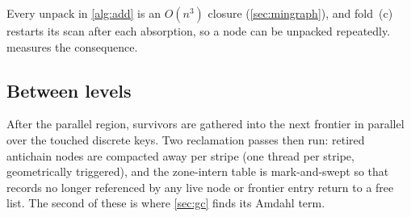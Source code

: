 Every $\mathrm{unpack}$ in \cref{alg:add} is an $O(n^3)$ closure
(\cref{sec:mingraph}), and fold~(c) restarts its scan after each absorption, so a
node can be unpacked repeatedly.   measures the consequence.

\subsection{Between levels}

After the parallel region, survivors are gathered into the next frontier in
parallel over the touched discrete keys.  Two reclamation passes then run:
retired antichain nodes are compacted away per stripe (one thread per stripe,
geometrically triggered), and the zone-intern table is mark-and-swept so that
records no longer referenced by any live node or frontier entry return to a free
list.  The second of these is where \cref{sec:gc} finds its Amdahl term.
